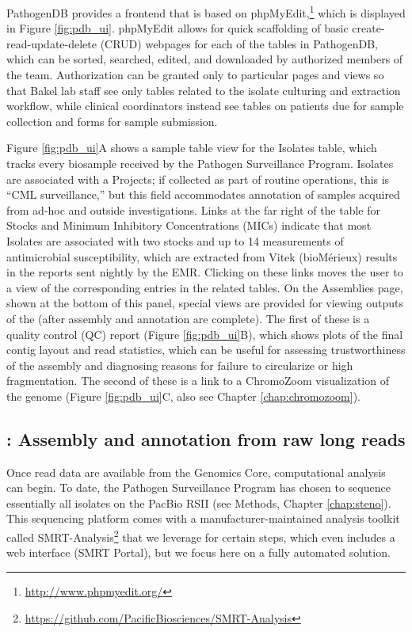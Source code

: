 PathogenDB provides a frontend that is based on phpMyEdit,\footnote{\url{http://www.phpmyedit.org/}} which is displayed in Figure \ref{fig:pdb_ui}. phpMyEdit allows for quick scaffolding of basic create-read-update-delete (CRUD) webpages for each of the tables in PathogenDB, which can be sorted, searched, edited, and downloaded by authorized members of the team. Authorization can be granted only to particular pages and views so that Bakel lab staff see only tables related to the isolate culturing and extraction workflow, while clinical coordinators instead see tables on patients due for sample collection and forms for sample submission.

Figure \ref{fig:pdb_ui}A shows a sample table view for the Isolates table, which tracks every biosample received by the Pathogen Surveillance Program. Isolates are associated with a Projects; if collected as part of routine operations, this is ``CML surveillance,'' but this field accommodates annotation of samples acquired from ad-hoc and outside investigations. Links at the far right of the table for Stocks and Minimum Inhibitory Concentrations (MICs) indicate that most Isolates are associated with two stocks and up to 14 measurements of antimicrobial susceptibility, which are extracted from Vitek (bioMérieux) results in the reports sent nightly by the EMR. Clicking on these links moves the user to a view of the corresponding entries in the related tables. On the Assemblies page, shown at the bottom of this panel, special views are provided for viewing outputs of the \pathogendbpipeline{} (after assembly and annotation are complete). The first of these is a quality control (QC) report (Figure \ref{fig:pdb_ui}B), which shows plots of the final contig layout and read statistics, which can be useful for assessing trustworthiness of the assembly and diagnosing reasons for failure to circularize or high fragmentation. The second of these is a link to a ChromoZoom visualization of the genome (Figure \ref{fig:pdb_ui}C, also see Chapter \ref{chap:chromozoom}).

\subsection{\pathogendbpipeline: Assembly and annotation from raw long reads}

Once read data are available from the Genomics Core, computational analysis can begin. To date, the Pathogen Surveillance Program has chosen to sequence essentially all isolates on the PacBio RSII (see Methods, Chapter \ref{chap:steno}). This sequencing platform comes with a manufacturer-maintained analysis toolkit called SMRT-Analysis\footnote[][-2.5cm]{\url{https://github.com/PacificBiosciences/SMRT-Analysis}} that we leverage for certain steps, which even includes a web interface (SMRT Portal), but we focus here on a fully automated solution.

